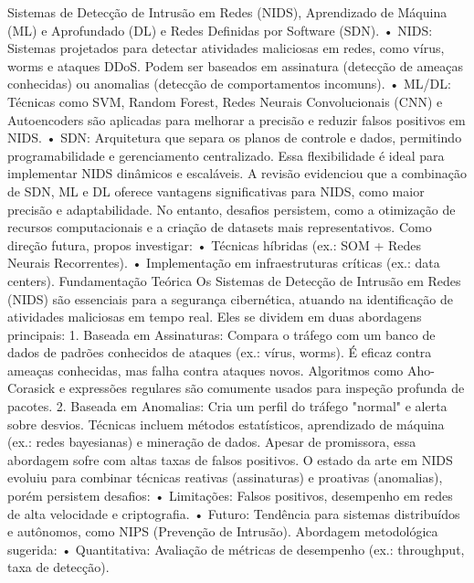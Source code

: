 \documentclass[conference]{IEEEtran}
\begin{document}
    \cite{6}
    \cite{7}
    \cite{8}
    \cite{9}
    \cite{10}
    \cite{11}
    \cite{12}
    \cite{13}
    \cite{14} Sistemas de Detecção de Intrusão em Redes (NIDS), Aprendizado de Máquina (ML) e Aprofundado (DL) e Redes Definidas por Software (SDN).
    • NIDS: Sistemas projetados para detectar atividades maliciosas em redes, como vírus, worms e ataques DDoS. Podem ser baseados em assinatura (detecção de ameaças conhecidas) ou anomalias (detecção de comportamentos incomuns).
    • ML/DL: Técnicas como SVM, Random Forest, Redes Neurais Convolucionais (CNN) e Autoencoders são aplicadas para melhorar a precisão e reduzir falsos positivos em NIDS.
    • SDN: Arquitetura que separa os planos de controle e dados, permitindo programabilidade e gerenciamento centralizado. Essa flexibilidade é ideal para implementar NIDS dinâmicos e escaláveis.
    A revisão evidenciou que a combinação de SDN, ML e DL oferece vantagens significativas para NIDS, como maior precisão e adaptabilidade. No entanto, desafios persistem, como a otimização de recursos computacionais e a criação de datasets mais representativos. Como direção futura, propos investigar:
    • Técnicas híbridas (ex.: SOM + Redes Neurais Recorrentes).
    • Implementação em infraestruturas críticas (ex.: data centers).
    \cite{15} Fundamentação Teórica
    Os Sistemas de Detecção de Intrusão em Redes (NIDS) são essenciais para a segurança cibernética, atuando na identificação de atividades maliciosas em tempo real. Eles se dividem em duas abordagens principais:
        1. Baseada em Assinaturas: Compara o tráfego com um banco de dados de padrões conhecidos de ataques (ex.: vírus, worms). É eficaz contra ameaças conhecidas, mas falha contra ataques novos. Algoritmos como Aho-Corasick e expressões regulares são comumente usados para inspeção profunda de pacotes.
        2. Baseada em Anomalias: Cria um perfil do tráfego "normal" e alerta sobre desvios. Técnicas incluem métodos estatísticos, aprendizado de máquina (ex.: redes bayesianas) e mineração de dados. Apesar de promissora, essa abordagem sofre com altas taxas de falsos positivos.
        O estado da arte em NIDS evoluiu para combinar técnicas reativas (assinaturas) e proativas (anomalias), porém persistem desafios:
        • Limitações: Falsos positivos, desempenho em redes de alta velocidade e criptografia.
        • Futuro: Tendência para sistemas distribuídos e autônomos, como NIPS (Prevenção de Intrusão).
    Abordagem metodológica sugerida:
        • Quantitativa: Avaliação de métricas de desempenho (ex.: throughput, taxa de detecção).
\end{document}
